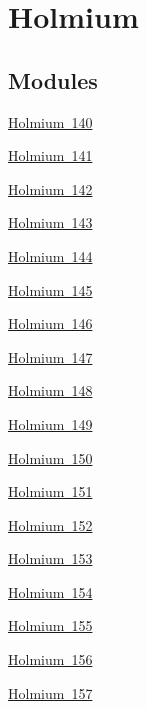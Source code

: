\hypertarget{group___isotope_const-_holmium}{}\section{Holmium}
\label{group___isotope_const-_holmium}
\subsection*{Modules}
\begin{DoxyCompactItemize}
\item 
\mbox{\hyperlink{group___isotope_const-_holmium-_ho140}{Holmium 140}}
\item 
\mbox{\hyperlink{group___isotope_const-_holmium-_ho141}{Holmium 141}}
\item 
\mbox{\hyperlink{group___isotope_const-_holmium-_ho142}{Holmium 142}}
\item 
\mbox{\hyperlink{group___isotope_const-_holmium-_ho143}{Holmium 143}}
\item 
\mbox{\hyperlink{group___isotope_const-_holmium-_ho144}{Holmium 144}}
\item 
\mbox{\hyperlink{group___isotope_const-_holmium-_ho145}{Holmium 145}}
\item 
\mbox{\hyperlink{group___isotope_const-_holmium-_ho146}{Holmium 146}}
\item 
\mbox{\hyperlink{group___isotope_const-_holmium-_ho147}{Holmium 147}}
\item 
\mbox{\hyperlink{group___isotope_const-_holmium-_ho148}{Holmium 148}}
\item 
\mbox{\hyperlink{group___isotope_const-_holmium-_ho149}{Holmium 149}}
\item 
\mbox{\hyperlink{group___isotope_const-_holmium-_ho150}{Holmium 150}}
\item 
\mbox{\hyperlink{group___isotope_const-_holmium-_ho151}{Holmium 151}}
\item 
\mbox{\hyperlink{group___isotope_const-_holmium-_ho152}{Holmium 152}}
\item 
\mbox{\hyperlink{group___isotope_const-_holmium-_ho153}{Holmium 153}}
\item 
\mbox{\hyperlink{group___isotope_const-_holmium-_ho154}{Holmium 154}}
\item 
\mbox{\hyperlink{group___isotope_const-_holmium-_ho155}{Holmium 155}}
\item 
\mbox{\hyperlink{group___isotope_const-_holmium-_ho156}{Holmium 156}}
\item 
\mbox{\hyperlink{group___isotope_const-_holmium-_ho157}{Holmium 157}}

\end{DoxyCompactItemize}
